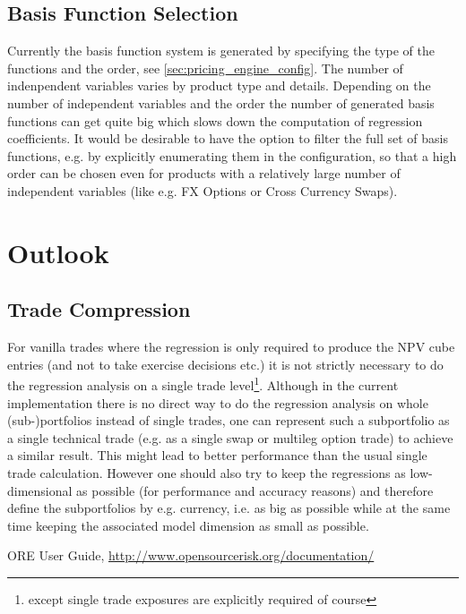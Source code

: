\documentclass[12pt, a4paper]{article}
\begin{document}
\subsection{Basis Function Selection}

Currently the basis function system is generated by specifying the type of the functions and the order, see
\ref{sec:pricing_engine_config}. The number of indenpendent variables varies by product type and details. Depending on
the number of independent variables and the order the number of generated basis functions can get quite big which slows
down the computation of regression coefficients. It would be desirable to have the option to filter the full set of
basis functions, e.g. by explicitly enumerating them in the configuration, so that a high order can be chosen even for
products with a relatively large number of independent variables (like e.g. FX Options or Cross Currency Swaps).

\section{Outlook}

\subsection{Trade Compression}

For vanilla trades where the regression is only required to produce the NPV cube entries (and not to take exercise
decisions etc.) it is not strictly necessary to do the regression analysis on a single trade level\footnote{except
  single trade exposures are explicitly required of course}. Although in the current implementation there is no direct
way to do the regression analysis on whole (sub-)portfolios instead of single trades, one can represent such a
subportfolio as a single technical trade (e.g. as a single swap or multileg option trade) to achieve a similar
result. This might lead to better performance than the usual single trade calculation. However one should also try to
keep the regressions as low-dimensional as possible (for performance and accuracy reasons) and therefore define the
subportfolios by e.g. currency, i.e. as big as possible while at the same time keeping the associated model dimension as
small as possible.



\begin{thebibliography}{1}

 ORE User Guide, \url{http://www.opensourcerisk.org/documentation/}

\end{thebibliography}
\end{document}
